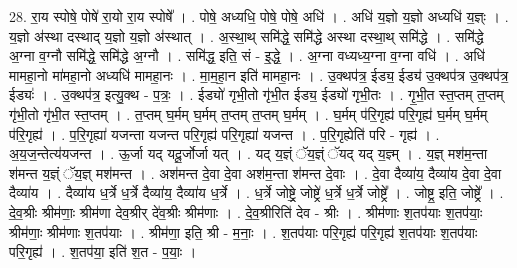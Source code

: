 \documentclass[17pt]{extarticle}
\begin{document}
28. रा॒य स्पोषे॒ पोषे॑ रा॒यो रा॒य स्पोषे᳚ । . पोषे॒ अध्यधि॒ पोषे॒ पोषे॒ अधि॑ । . अधि॑ य॒ज्ञो य॒ज्ञो अध्यधि॑ य॒ज्ञ्ः । . य॒ज्ञो अ॑स्था दस्थाद् य॒ज्ञो य॒ज्ञो अ॑स्थात् । . अ॒स्था॒थ् समि॑द्धे॒ समि॑द्धे अस्था दस्था॒थ् समि॑द्धे । . समि॑द्धे अ॒ग्ना व॒ग्नौ समि॑द्धे॒ समि॑द्धे अ॒ग्नौ । . समि॑द्ध॒ इति॒ सं - इ॒द्धे॒ । . अ॒ग्ना वध्यध्य॒ग्ना व॒ग्ना वधि॑ । . अधि॑ मामहा॒नो मा॑महा॒नो अध्यधि॑ मामहा॒नः । . मा॒म॒हा॒न इति॑ मामहा॒नः । . उ॒क्थप॑त्र॒ ईड्य॒ ईड्य॑ उ॒क्थप॑त्र उ॒क्थप॑त्र॒ ईड्यः॑ । . उ॒क्थप॑त्र॒ इत्यु॒क्थ - प॒त्रः॒ । . ईड्यो॑ गृभी॒तो गृ॑भी॒त ईड्य॒ ईड्यो॑ गृभी॒तः । . गृ॒भी॒त स्त॒प्तम् त॒प्तम् गृ॑भी॒तो गृ॑भी॒त स्त॒प्तम् । . त॒प्तम् घ॒र्मम् घ॒र्मम् त॒प्तम् त॒प्तम् घ॒र्मम् । . घ॒र्मम् प॑रि॒गृह्य॑ परि॒गृह्य॑ घ॒र्मम् घ॒र्मम् प॑रि॒गृह्य॑ । . प॒रि॒गृह्या॑ यजन्ता यजन्त परि॒गृह्य॑ परि॒गृह्या॑ यजन्त । . प॒रि॒गृह्येति॑ परि - गृह्य॑ । . अ॒य॒ज॒न्तेत्य॑यजन्त । . ऊ॒र्जा यद् यदू॒र्जोर्जा यत् । . यद् य॒ज्ञ्ं ॅय॒ज्ञ्ं ॅयद् यद् य॒ज्ञ्म् । . य॒ज्ञ् मश॑म॒न्ता श॑मन्त य॒ज्ञ्ं ॅय॒ज्ञ् मश॑मन्त । . अश॑मन्त दे॒वा दे॒वा अश॑म॒न्ता श॑मन्त दे॒वाः । . दे॒वा दैव्या॑य॒ दैव्या॑य दे॒वा दे॒वा दैव्या॑य । . दैव्या॑य ध॒र्त्रे ध॒र्त्रे दैव्या॑य॒ दैव्या॑य ध॒र्त्रे । . ध॒र्त्रे जोष्ट्रे॒ जोष्ट्रे॑ ध॒र्त्रे ध॒र्त्रे जोष्ट्रे᳚ । . जोष्ट्र॒ इति॒ जोष्ट्रे᳚ । . दे॒व॒श्रीः श्रीम॑णाः॒ श्रीम॑णा देव॒श्रीर् दे॑व॒श्रीः श्रीम॑णाः । . दे॒व॒श्रीरिति॑ देव - श्रीः । . श्रीम॑णाः श॒तप॑याः श॒तप॑याः॒ श्रीम॑णाः॒ श्रीम॑णाः श॒तप॑याः । . श्रीम॑णा॒ इति॒ श्री - म॒नाः॒ । . श॒तप॑याः परि॒गृह्य॑ परि॒गृह्य॑ श॒तप॑याः श॒तप॑याः परि॒गृह्य॑ । . श॒तप॑या॒ इति॑ श॒त - प॒याः॒ । \newline
\end{document}
